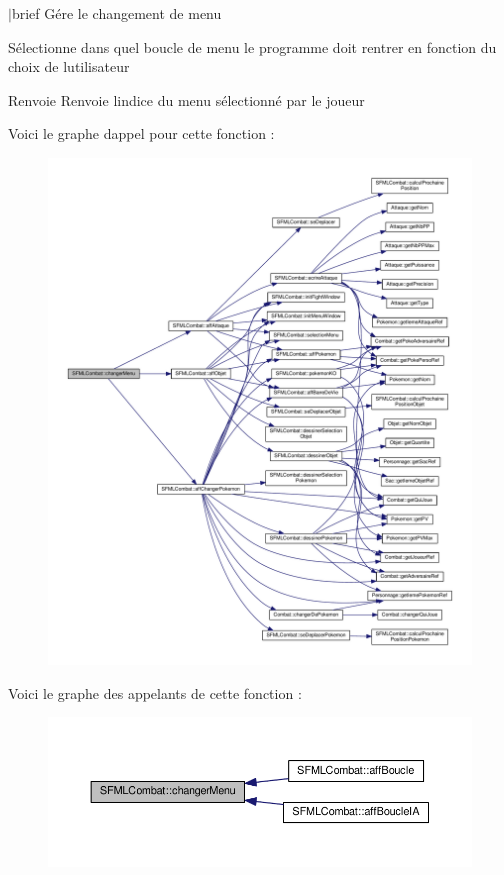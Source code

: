 $\vert$brief Gére le changement de menu

Sélectionne dans quel boucle de menu le programme doit rentrer en fonction du choix de l\textquotesingle{}utilisateur \begin{DoxyReturn}{Renvoie}
Renvoie l\textquotesingle{}indice du menu sélectionné par le joueur 
\end{DoxyReturn}
Voici le graphe d\textquotesingle{}appel pour cette fonction \+:\nopagebreak
\begin{figure}[H]
\begin{center}
\leavevmode
\includegraphics[width=350pt]{class_s_f_m_l_combat_ab856672c59db95d55c7c28cd3a1eee93_cgraph}
\end{center}
\end{figure}
Voici le graphe des appelants de cette fonction \+:\nopagebreak
\begin{figure}[H]
\begin{center}
\leavevmode
\includegraphics[width=350pt]{class_s_f_m_l_combat_ab856672c59db95d55c7c28cd3a1eee93_icgraph}
\end{center}
\end{figure}
\mbox{\label{class_s_f_m_l_combat_ab1f7a0fa82f0cfd9c0a0e1c321f5f7e7}} 
